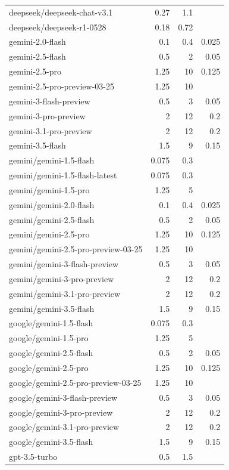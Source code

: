 \begin{longtable}{lrrr}
deepseek/deepseek-chat-v3.1 & 0.27 & 1.1 &  \\
deepseek/deepseek-r1-0528 & 0.18 & 0.72 &  \\
gemini-2.0-flash & 0.1 & 0.4 & 0.025 \\
gemini-2.5-flash & 0.5 & 2 & 0.05 \\
gemini-2.5-pro & 1.25 & 10 & 0.125 \\
gemini-2.5-pro-preview-03-25 & 1.25 & 10 &  \\
gemini-3-flash-preview & 0.5 & 3 & 0.05 \\
gemini-3-pro-preview & 2 & 12 & 0.2 \\
gemini-3.1-pro-preview & 2 & 12 & 0.2 \\
gemini-3.5-flash & 1.5 & 9 & 0.15 \\
gemini/gemini-1.5-flash & 0.075 & 0.3 &  \\
gemini/gemini-1.5-flash-latest & 0.075 & 0.3 &  \\
gemini/gemini-1.5-pro & 1.25 & 5 &  \\
gemini/gemini-2.0-flash & 0.1 & 0.4 & 0.025 \\
gemini/gemini-2.5-flash & 0.5 & 2 & 0.05 \\
gemini/gemini-2.5-pro & 1.25 & 10 & 0.125 \\
gemini/gemini-2.5-pro-preview-03-25 & 1.25 & 10 &  \\
gemini/gemini-3-flash-preview & 0.5 & 3 & 0.05 \\
gemini/gemini-3-pro-preview & 2 & 12 & 0.2 \\
gemini/gemini-3.1-pro-preview & 2 & 12 & 0.2 \\
gemini/gemini-3.5-flash & 1.5 & 9 & 0.15 \\
google/gemini-1.5-flash & 0.075 & 0.3 &  \\
google/gemini-1.5-pro & 1.25 & 5 &  \\
google/gemini-2.5-flash & 0.5 & 2 & 0.05 \\
google/gemini-2.5-pro & 1.25 & 10 & 0.125 \\
google/gemini-2.5-pro-preview-03-25 & 1.25 & 10 &  \\
google/gemini-3-flash-preview & 0.5 & 3 & 0.05 \\
google/gemini-3-pro-preview & 2 & 12 & 0.2 \\
google/gemini-3.1-pro-preview & 2 & 12 & 0.2 \\
google/gemini-3.5-flash & 1.5 & 9 & 0.15 \\
gpt-3.5-turbo & 0.5 & 1.5 &  \\

\end{longtable}
